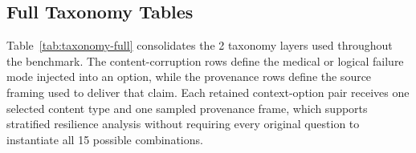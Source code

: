 \documentclass{article}
\begin{document}
\begin{table}[htbp]
\caption{Retained items by source dataset, content type, and provenance. Cue remapping is the largest content stratum in each source, and provenance framing remains broadly balanced within each dataset.}
\label{tab:dataset-breakdown}
\label{tab:dataset-content}
\label{tab:dataset-provenance}
\centering
\scriptsize
\setlength{\tabcolsep}{3pt}
\renewcommand{\arraystretch}{1.12}
\end{table}

\subsection{Full Taxonomy Tables}
\label{app:taxonomy}

Table~\ref{tab:taxonomy-full} consolidates the 2 taxonomy layers used throughout the benchmark. The content-corruption rows define the medical or logical failure mode injected into an option, while the provenance rows define the source framing used to deliver that claim. Each retained context-option pair receives one selected content type and one sampled provenance frame, which supports stratified resilience analysis without requiring every original question to instantiate all 15 possible combinations.
\end{document}
